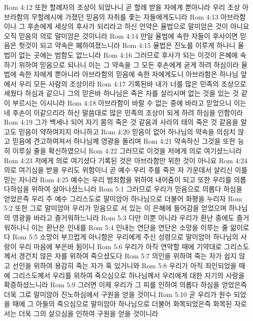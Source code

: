 Rom 4:12  또한 할례자의 조상이 되었나니 곧 할례 받을 자에게 뿐아니라 우리 조상 아브라함의 무할례시에 가졌던 믿음의 자취를 좇는 자들에게도니라
Rom 4:13  아브라함이나 그 후손에게 세상의 후사가 되리라고 하신 언약은 율법으로 말미암은 것이 아니요 오직 믿음의 의로 말미암은 것이니라
Rom 4:14  만일 율법에 속한 자들이 후사이면 믿음은 헛것이 되고 약속은 폐하여졌느니라
Rom 4:15  율법은 진노를 이루게 하나니 율법이 없는 곳에는 범함도 없느니라
Rom 4:16  그러므로 후사가 되는 이것이 은혜에 속하기 위하여 믿음으로 되나니 이는 그 약속을 그 모든 후손에게 굳게 하려 하심이라 율법에 속한 자에게 뿐아니라 아브라함의 믿음에 속한 자에게도니 아브라함은 하나님 앞에서 우리 모든 사람의 조상이라
Rom 4:17  기록된바 내가 너를 많은 민족의 조상으로 세웠다 하심과 같으니 그의 믿은바 하나님은 죽은 자를 살리시며 없는 것을 있는 것 같이 부르시는 이시니라
Rom 4:18  아브라함이 바랄 수 없는 중에 바라고 믿었으니 이는 네 후손이 이같으리라 하신 말씀대로 많은 민족의 조상이 되게 하려 하심을 인함이라
Rom 4:19  그가 백세나 되어 자기 몸의 죽은 것 같음과 사라의 태의 죽은 것 같음을 알고도 믿음이 약하여지지 아니하고
Rom 4:20  믿음이 없어 하나님의 약속을 의심치 않고 믿음에 견고하여져서 하나님께 영광을 돌리며
Rom 4:21  약속하신 그것을 또한 능히 이루실 줄을 확신하였으니
Rom 4:22  그러므로 이것을 저에게 의로 여기셨느니라
Rom 4:23  저에게 의로 여기셨다 기록된 것은 아브라함만 위한 것이 아니요
Rom 4:24  의로 여기심을 받을 우리도 위함이니 곧 예수 우리 주를 죽은 자 가운데서 살리신 이를 믿는 자니라
Rom 4:25  예수는 우리 범죄함을 위하여 내어줌이 되고 또한 우리를 의롭다하심을 위하여 살아나셨느니라
Rom 5:1  그러므로 우리가 믿음으로 의롭다 하심을 얻었은즉 우리 주 예수 그리스도로 말미암아 하나님으로 더불어 화평을 누리자
Rom 5:2  또한 그로 말미암아 우리가 믿음으로 서 있는 이 은혜에 들어감을 얻었으며 하나님의 영광을 바라고 즐거워하느니라
Rom 5:3  다만 이뿐 아니라 우리가 환난 중에도 즐거워하나니 이는 환난은 인내를
Rom 5:4  인내는 연단을 연단은 소망을 이루는 줄 앎이로다
Rom 5:5  소망이 부끄럽게 아니함은 우리에게 주신 성령으로 말미암아 하나님의 사랑이 우리 마음에 부은바 됨이니
Rom 5:6  우리가 아직 연약할 때에 기약대로 그리스도께서 경건치 않은 자를 위하여 죽으셨도다
Rom 5:7  의인을 위하여 죽는 자가 쉽지 않고 선인을 위하여 용감히 죽는 자가 혹 있거니와
Rom 5:8  우리가 아직 죄인되었을 때에 그리스도께서 우리를 위하여 죽으심으로 하나님께서 우리에게 대한 자기의 사랑을 확증하셨느니라
Rom 5:9  그러면 이제 우리가 그 피를 인하여 의롭다 하심을 얻었은즉 더욱 그로 말미암아 진노하심에서 구원을 얻을 것이니
Rom 5:10  곧 우리가 원수 되었을 때에 그 아들의 죽으심으로 말미암아 하나님으로 더불어 화목되었은즉 화목된 자로서는 더욱 그의 살으심을 인하여 구원을 얻을 것이니라
